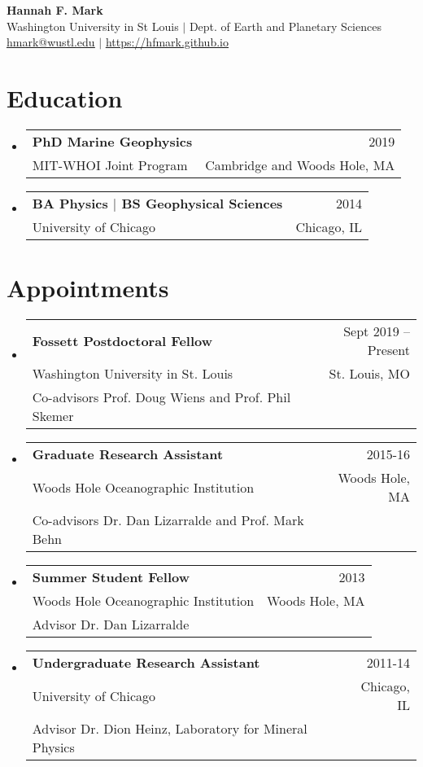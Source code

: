 \documentclass[letterpaper,11pt]{article}
\makeatletter
\newcommand{\resumeSubheading}[4]{
  \vspace{-2pt}\item
    \begin{tabular*}{0.97\textwidth}[t]{l@{\extracolsep{\fill}}r}
      \textbf{#1} & #2 \\
      \small#3 & \small #4 \\
    \end{tabular*}\vspace{-7pt}
}
\newcommand{\resumeAppt}[5]{
  \vspace{-2pt}\item
    \begin{tabular*}{0.97\textwidth}[t]{l@{\extracolsep{\fill}}r}
      \textbf{#1} & #2 \\
      \small#3 & \small #4 \\
      \small#5\\
    \end{tabular*}\vspace{-7pt}
}
\newcommand{\resumeSubHeadingListStart}{\begin{itemize}[leftmargin=0.15in, label={}]}
\newcommand{\resumeSubHeadingListEnd}{\end{itemize}}
\makeatother
\begin{document}
\begin{center}
    \textbf{\LARGE Hannah F. Mark} \\ \vspace{1pt}
    \small Washington University in St Louis $|$ Dept. of Earth and Planetary Sciences \\
    \small \href{mailto:hmark@wustl.edu}{\underline{hmark@wustl.edu}} $|$
    \href{https://hfmark.github.io}{\underline{https://hfmark.github.io}}
\end{center}


\section{Education}
  \resumeSubHeadingListStart
    \resumeSubheading
      {PhD Marine Geophysics}{2019}
      {MIT-WHOI Joint Program}{Cambridge and Woods Hole, MA}
    \resumeSubheading
      {BA Physics $|$ BS Geophysical Sciences}{2014}
      {University of Chicago}{Chicago, IL}
  \resumeSubHeadingListEnd


\section{Appointments}
  \resumeSubHeadingListStart

    \resumeAppt
      {Fossett Postdoctoral Fellow}{Sept 2019 -- Present}
      {Washington University in St. Louis}{St. Louis, MO}
      {Co-advisors Prof. Doug Wiens and Prof. Phil Skemer}

    \resumeAppt
      {Graduate Research Assistant}{2015-16}
      {Woods Hole Oceanographic Institution}{Woods Hole, MA}
      {Co-advisors Dr. Dan Lizarralde and Prof. Mark Behn}

    \resumeAppt
      {Summer Student Fellow}{2013}
      {Woods Hole Oceanographic Institution}{Woods Hole, MA}
      {Advisor Dr. Dan Lizarralde}

    \resumeAppt
      {Undergraduate Research Assistant}{2011-14}
      {University of Chicago}{Chicago, IL}
      {Advisor Dr. Dion Heinz, Laboratory for Mineral Physics}

  \resumeSubHeadingListEnd


\end{document}
